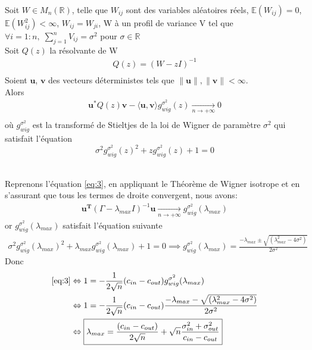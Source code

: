 \begin{theorem}\label{th:2}

Soit $W \in M_{n}(\mathbb{R})$, telle que $W_{ij}$ sont des variables aléatoires réels, $\mathbb{E}(W_{ij}) = 0$, $\mathbb{E}(W_{ij}^2) < \infty$, $W_{ij} = W_{ji}$, W à un profil de variance V tel que $\forall i = 1:n , \; \sum_{j=1}^{n}V_{ij} = \sigma^2$ pour $\sigma \in \mathbb{R}$\\
Soit $Q(z)$ la résolvante de W
\begin{align*} 
Q(z) = (W - zI)^{-1}\\
\end{align*}
Soient $\mathbf{u}$, $\mathbf{v}$ des vecteurs déterministes tels que $\|\mathbf{u}\|, \|\mathbf{v}\| < \infty$.\\
Alors 
\begin{align*} 
\mathbf{u}^*Q(z)\mathbf{v} - \langle \mathbf{u}, \mathbf{v} \rangle g_{wig}^{\sigma^2}(z) \xrightarrow[n \to +\infty]{} 0\\
\end{align*}
où $g_{wig}^{\sigma^2}$ est la transformé de Stieltjes de la loi de Wigner de paramètre $\sigma^2$ qui satisfait l'équation
\begin{equation}
	\sigma^2g_{wig}^{\sigma^2}(z)^2+z g_{wig}^{\sigma^2}(z)+1=0
\end{equation}\\
\end{theorem}

Reprenons l’équation \eqref{eq:3}, en appliquant le Théorème de Wigner isotrope et en s'assurant que tous les termes de droite convergent, nous avons:
\begin{align*}
\mathbf{u^T}(\Gamma - \lambda_{max}I)^{-1}\mathbf{u} \xrightarrow[n \to +\infty]{} g_{wig}^{\sigma^2}(\lambda_{max})
\end{align*}
or $g_{wig}^{\sigma^2}(\lambda_{max})$ satisfait l'équation suivante 
\begin{align}
	\sigma^2g_{wig}^{\sigma^2}(\lambda_{max})^2+\lambda_{max}g_{wig}^{\sigma^2}(\lambda_{max})+1=0 \implies g_{wig}^{\sigma^2}(\lambda_{max}) = \frac{- \lambda_{max} \pm \sqrt{(\lambda_{max}^2 - 4\sigma^2)}}{2\sigma^2}
\end{align}
Donc
\begin{align}
	\eqref{eq:3} &\Leftrightarrow1 = -\frac{1}{2\sqrt{n}}(c_{in} - c_{out}) g_{wig}^{\sigma^2}(\lambda_{max}) \nonumber\\
	&\Leftrightarrow 1 = -\frac{1}{2\sqrt{n}}(c_{in} - c_{out}) \frac{- \lambda_{max} - \sqrt{(\lambda_{max}^2 - 4\sigma^2)}}{2\sigma^2} \nonumber\\
	&\Leftrightarrow \boxed{\lambda_{max}=\frac{(c_{in} - c_{out})}{2\sqrt{n}} + \sqrt{n}\frac{\sigma_{in}^2 + \sigma_{out}^2}{c_{in} - c_{out}}} \label{z_1}
\end{align}

